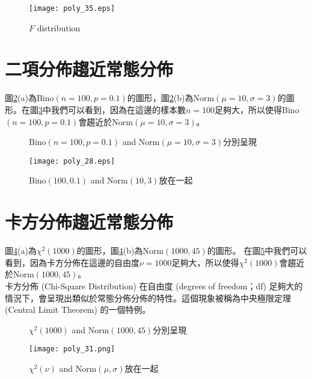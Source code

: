 \documentclass[12pt, a4paper]{article}
\begin{document}
\begin{figure}[h]
\centering
\texttt{[image: poly\_35.eps]}
\caption{$F$ distribution}
\label{fig:poly_35.eps}
\end{figure}

\section{二項分佈趨近常態分佈}
圖\;\ref{fig:parallel3_1}\;(a)為\;Bino$(n=100, p=0.1)$\;的圖形，圖\;\ref{fig:parallel3_1}\;(b)為\;Norm$(\mu=10, \sigma = 3)$\;的圖形。在圖\;\ref{fig:poly_28.eps}\;中我們可以看到，因為在這邊的樣本數\;$n=100$\;足夠大，所以使得\;Bino$(n=100, p=0.1)$\;會趨近於\;Norm$(\mu=10, \sigma = 3)$\;。

\begin{figure}[H]
\centering
{}
\caption{Bino$(n=100, p=0.1)$ and Norm$(\mu=10, \sigma = 3)$分別呈現}
\label{fig:parallel3_1}
\end{figure}

\begin{figure}[H]
\centering
\texttt{[image: poly\_28.eps]}
\caption{Bino$(100, 0.1)$ and Norm$(10, 3)$放在一起}
\label{fig:poly_28.eps}
\end{figure} 

\section{卡方分佈趨近常態分佈}
圖\;\ref{fig:parallel3_2}\;(a)\;為\;$\chi^2(1000)$\;的圖形，圖\;\ref{fig:parallel3_2}\;(b)\;為\;Norm$(1000, 45)$\;的圖形。
在圖\;\ref{fig:poly_31.png}\;中我們可以看到，因為卡方分佈在這邊的自由度\;$\nu=1000$\;足夠大，所以使得\;$\chi^2(1000)$\;會趨近於\;Norm$(1000, 45)$\;。\\
卡方分佈 (Chi-Square Distribution) 在自由度 (degrees of freedom；df) 足夠大的情況下，會呈現出類似於常態分佈分佈的特性。這個現象被稱為中央極限定理 (Central Limit Theorem) 的一個特例。

\begin{figure}[h]
\centering
{}
\caption{$\chi^2(1000)$ and Norm$(1000, 45)$分別呈現}
\label{fig:parallel3_2}
\end{figure}

\begin{figure}[h]
\centering
\texttt{[image: poly\_31.png]}
\caption{$\chi^2(\nu)$ and Norm$(\mu, \sigma)$放在一起}
\label{fig:poly_31.png}
\end{figure} 
\end{document}
